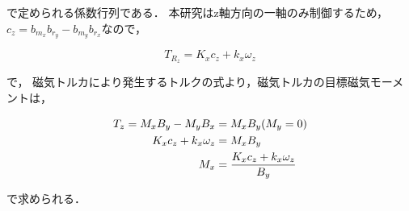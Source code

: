 で定められる係数行列である．
本研究はz軸方向の一軸のみ制御するため，$c_z = b_{m_x}b_{r_y} - b_{m_y}b_{r_x}$なので，

\begin{equation}
    T_{R_z} = K_x c_z + k_x \omega_z 
\end{equation}

で，
磁気トルカにより発生するトルクの式より，磁気トルカの目標磁気モーメントは，

\begin{equation}
    \begin{aligned}
        T_z = M_x B_y - M_y B_x &= M_x B_y \space (M_y = 0)\\
         K_x c_z + k_x \omega_z &= M_x B_y\\
                            M_x &= \frac{K_x c_z + k_x \omega_z}{B_y}
    \end{aligned}
\end{equation}

で求められる．